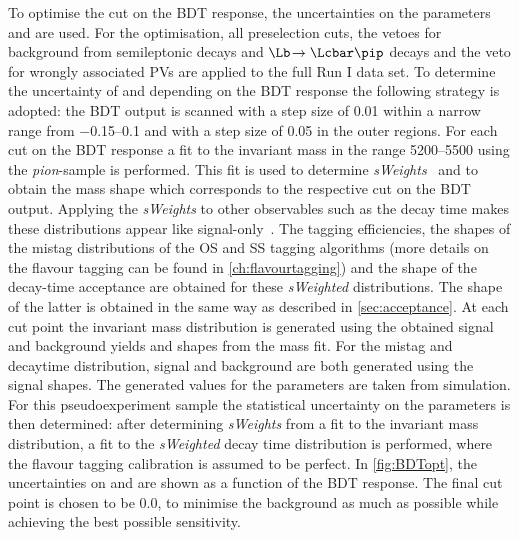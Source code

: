 To optimise the cut on the \ac{BDT} response, the uncertainties on the \CP parameters \Sf and \Sfbar are used.
For the optimisation, all preselection cuts, the vetoes for background from semileptonic decays and $\Lb\!\to\Lcbar\pip$ decays and the veto for wrongly associated \ac{PV}s are applied to the full Run I data set.
To determine the uncertainty of \Sf and \Sfbar depending on the \ac{BDT} response the following strategy is adopted:
the \ac{BDT} output is scanned with a step size of \num{0.01} within a narrow range from \numrange{-0.15}{0.1} and with a step size of \num{0.05} in the outer regions.
For each cut on the \ac{BDT} response a fit to the invariant \Bz mass in the range \SIrange[per-mode=symbol]{5200}{5500}{\MeVcc} using the \emph{pion}-sample is performed.
This fit is used to determine \emph{sWeights}~\cite{Pivk:2004ty} and to obtain the mass shape which corresponds to the respective cut on the \ac{BDT} output.
Applying the \emph{sWeights} to other observables such as the decay time makes these distributions appear like signal-only~\cite{2009arXiv0905.0724X}.
The tagging efficiencies, the shapes of the mistag distributions of the OS and SS tagging algorithms (more details on the flavour tagging can be found in \cref{ch:flavourtagging}) and the shape of the decay-time acceptance are obtained for these \emph{sWeighted} distributions.
The shape of the latter is obtained in the same way as described in \cref{sec:acceptance}.
At each cut point the invariant mass distribution is generated using the obtained signal and background yields and shapes from the mass fit.
For the mistag and decaytime distribution, signal and background are both generated using the signal shapes.
The generated values for the \CP parameters are taken from simulation.
For this pseudoexperiment sample the statistical uncertainty on the \CP parameters is then determined: after determining \emph{sWeights} from a fit to the invariant \Bz mass distribution, a \CP fit to the \emph{sWeighted} decay time distribution is performed, where the flavour tagging calibration is assumed to be perfect.
In \cref{fig:BDTopt}, the uncertainties on \Sf and \Sfbar are shown as a function of the \ac{BDT} response.
The final cut point is chosen to be \num{0.0}, to minimise the background as much as possible while achieving the best possible sensitivity.
